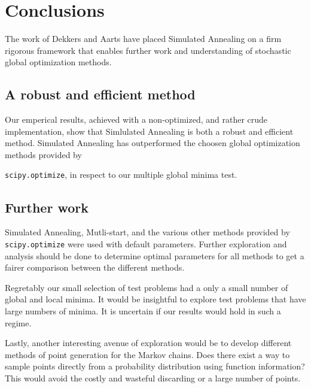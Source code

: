 \section{Conclusions}
\label{sec:conclusions}

The work of Dekkers and Aarts have placed Simulated Annealing on a firm rigorous framework that enables further
work and understanding of stochastic global optimization methods. 

\subsection{A robust and efficient method}

Our emperical results, achieved with a non-optimized, and rather
crude implementation, show that Simlulated Annealing is both a robust and efficient method. Simulated Annealing has
outperformed the choosen global optimization methods provided by

\noindent\texttt{scipy.optimize}, in respect to our multiple
global minima test.

\subsection{Further work}

Simulated Annealing, Mutli-start, and the various other methods provided by \texttt{scipy.optimize} were used with
default parameters. Further exploration and analysis should be done to determine optimal parameters for all methods 
to get a fairer comparison between the different methods.

Regretably our small selection of test problems had a only a small number of global and local minima. It would be
insightful to explore test problems that have large numbers of minima. It is uncertain if our results would hold
in such a regime.

Lastly, another interesting avenue of exploration would be to develop different methods of point generation for the
Markov chains. Does there exist a way to sample points directly from a probability distribution using function information?
This would avoid the costly and wasteful discarding or a large number of points.
